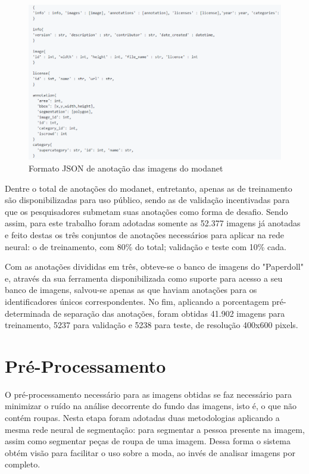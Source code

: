 \documentclass[12pt]{report}
\begin{document}
\begin{figure}
    \centering
    \includegraphics[width=\textwidth]{images/JSONformat.png}
    \caption{Formato JSON de anotação das imagens do modanet}
    \label{fig:JSONformat}
\end{figure}

Dentre o total de anotações do modanet, entretanto, apenas as de treinamento são disponibilizadas para uso público, sendo as de validação incentivadas para que os pesquisadores submetam suas anotações como forma de desafio. Sendo assim, para este trabalho foram adotadas somente as 52.377 imagens já anotadas e feito destas os três conjuntos de anotações necessários para aplicar na rede neural: o de treinamento, com 80\% do total; validação e teste com 10\% cada. 

Com as anotações divididas em três, obteve-se o banco de imagens do "Paperdoll" e, através da sua ferramenta disponibilizada como suporte para acesso a seu banco de imagens, salvou-se apenas as que haviam anotações para os identificadores únicos correspondentes. No fim, aplicando a porcentagem  pré-determinada de separação das anotações, foram obtidas 41.902 imagens para treinamento, 5237 para validação e 5238 para teste, de resolução 400x600 pixels.

\section{Pré-Processamento}

O pré-processamento necessário para as imagens obtidas se faz necessário para minimizar o ruído na análise decorrente do fundo das imagens, isto é, o que não contém roupas. Nesta etapa foram adotadas duas metodologias aplicando a mesma rede neural de segmentação: para segmentar a pessoa presente na imagem, assim como segmentar peças de roupa de uma imagem. Dessa forma o sistema obtém visão para facilitar o uso sobre a moda, ao invés de analisar imagens por completo. 
\end{document}
